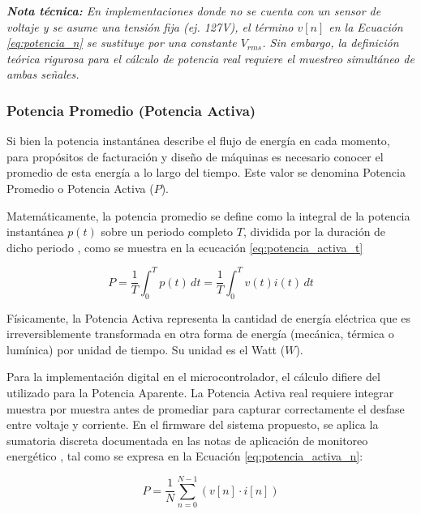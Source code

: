             \vspace{0.3cm}
            \noindent \textit{\textbf{Nota técnica:} En implementaciones donde no se cuenta con un sensor de voltaje y se asume una tensión fija (ej. 127V), el término $v[n]$ en la Ecuación \ref{eq:potencia_n} se sustituye por una constante $V_{rms}$. Sin embargo, la definición teórica rigurosa para el cálculo de potencia real requiere el muestreo simultáneo de ambas señales.}

        \subsubsection{Potencia Promedio (Potencia Activa)}

            Si bien la potencia instantánea describe el flujo de energía en cada momento, para propósitos de facturación y diseño de máquinas es necesario conocer el promedio de esta energía a lo largo del tiempo. Este valor se denomina Potencia Promedio o Potencia Activa ($P$).

            Matemáticamente, la potencia promedio se define como la integral de la potencia instantánea $p(t)$ sobre un periodo completo $T$, dividida por la duración de dicho periodo \cite{hayt2012}, como se muestra en la ecucación \ref{eq:potencia_activa_t}
        
            \begin{equation}
                P = \frac{1}{T} \int_{0}^{T} p(t) \, dt = \frac{1}{T} \int_{0}^{T} v(t) i(t) \, dt
                \label{eq:potencia_activa_t}
            \end{equation}

            Físicamente, la Potencia Activa representa la cantidad de energía eléctrica que es irreversiblemente transformada en otra forma de energía (mecánica, térmica o lumínica) por unidad de tiempo. Su unidad es el Watt ($W$).

            Para la implementación digital en el microcontrolador, el cálculo difiere del utilizado para la Potencia Aparente. La Potencia Activa real requiere integrar muestra por muestra antes de promediar para capturar correctamente el desfase entre voltaje y corriente. En el firmware del sistema propuesto, se aplica la sumatoria discreta documentada en las notas de aplicación de monitoreo energético \cite{programarfacil}, tal como se expresa en la Ecuación \ref{eq:potencia_activa_n}:

            \begin{equation}
                P = \frac{1}{N} \sum_{n=0}^{N-1} (v[n] \cdot i[n])
                \label{eq:potencia_activa_n}
            \end{equation}

